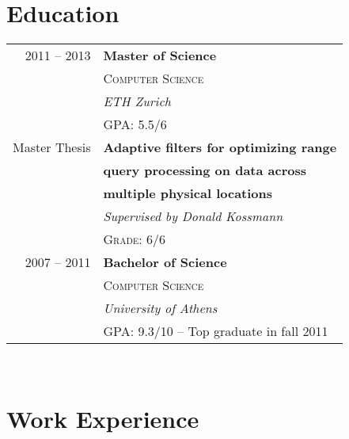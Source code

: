 \documentclass[10pt]{article} %
\begin{document}
\begin{minipage}[t]{0.5\textwidth} %
\vspace{0pt} %
	



\section{Education} 

\begin{tabular}{rl} %



2011 -- 2013 & \textbf{Master of Science} \\ 
& \textsc{Computer Science} \\ 
& \textit{ETH Zurich}\\
 \small  & GPA: 5.5/6 \\
Master Thesis
& \textbf{Adaptive filters for optimizing range}\\
& \textbf{query processing on data across}\\
& \textbf{multiple physical locations}\\
& \textit{Supervised by Donald Kossmann}\\
& \textsc{Grade: 6/6}\\
	 


2007 -- 2011 & \textbf{Bachelor of Science}\\
& \textsc{Computer Science} \\
& \textit{University of Athens} \\
\small  & GPA: 9.3/10 -- Top graduate in fall 2011\\
	
\end{tabular}\\[9pt]


\section{Work Experience} 


\end{minipage}
\end{document}
